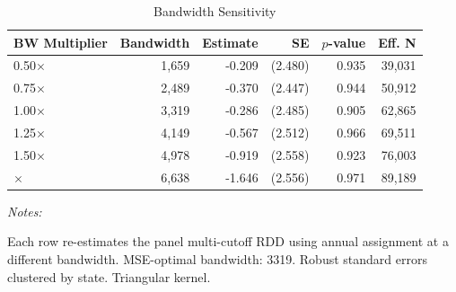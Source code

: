 \begin{table}[!h]
\centering
\small
\caption{\label{tab:bandwidth}Bandwidth Sensitivity}
\centering
\small
\begin{threeparttable}
\begin{tabular}[t]{lrrrrr}
\toprule
BW Multiplier & Bandwidth & Estimate & SE & $p$-value & Eff. N\\
\midrule
0.50$\times$ & 1,659 & -0.209 & (2.480) & 0.935 & 39,031\\
0.75$\times$ & 2,489 & -0.370 & (2.447) & 0.944 & 50,912\\
1.00$\times$ & 3,319 & -0.286 & (2.485) & 0.905 & 62,865\\
1.25$\times$ & 4,149 & -0.567 & (2.512) & 0.966 & 69,511\\
1.50$\times$ & 4,978 & -0.919 & (2.558) & 0.923 & 76,003\\
\addlinespace
2.00$\times$ & 6,638 & -1.646 & (2.556) & 0.971 & 89,189\\
\bottomrule
\end{tabular}
\begin{tablenotes}
\item \textit{Notes:} 
\item Each row re-estimates the panel multi-cutoff RDD using annual assignment at a different bandwidth. MSE-optimal bandwidth: 3319. Robust standard errors clustered by state. Triangular kernel.
\end{tablenotes}
\end{threeparttable}
\end{table}
